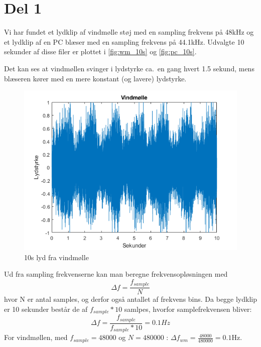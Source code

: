 \section{Del 1}

Vi har fundet et lydklip af vindmølle støj med en sampling frekvens på 48kHz og et lydklip af en PC blæser med en sampling frekvens på 44.1kHz. Udvalgte 10 sekunder af disse filer er plottet i \autoref{fig:wm_10s} og \autoref{fig:pc_10s}.

Det kan ses at vindmøllen svinger i lydstyrke ca.\ en gang hvert 1.5 sekund, mens blæseren kører med en mere konstant (og lavere) lydstyrke.

\begin{figure}[h]
\centering
\includegraphics[width=\textwidth]{figures/Windmill_10s}
\caption{10s lyd fra vindmølle}%
\label{fig:wm_10s}
\end{figure}

Ud fra sampling frekvenserne kan man beregne frekvensopløsningen med 
\begin{equation}
\Delta f = \frac{f_{sample}}{N}
\end{equation}
hvor N er antal samples, og derfor også antallet af frekvens bins.
Da begge lydklip er 10 sekunder består de af $f_{sample}*10$ samlpes, hvorfor samplefrekvensen bliver: 
\begin{equation}
\Delta f = \frac{f_{sample}}{f_{sample}*10} = 0.1 Hz
\end{equation}
For vindmøllen, med $f_{sample}=48000$ og $N=480000$ : $\Delta f_{wm} = \frac{48000}{480000} = 0.1$Hz.

